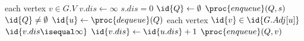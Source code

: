 \begin{codebox}
\li \For each vertex $v \in G.V$
\li \Do $v.dis \gets \infty$ \End
\li $s.dis = 0$
\li $\id{Q} \gets \emptyset$
\li $\proc{enqueue}(Q, s)$
\li \While $\id{Q} \neq \emptyset$
\li \Do $\id{u} \gets \proc{dequeue}(Q)$
\li \For each vertex $\id{v} \in \id{G.Adj[u]}$
\li \Do \If $\id{v.dis \isequal \infty}$
\li \Then $\id{v.dis} \gets \id{u.dis} + 1$
\li $\proc{enqueue}(Q, v)$ \End \End \End
\end{codebox}